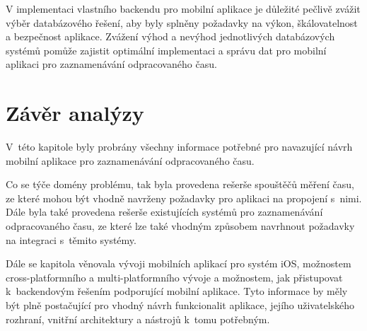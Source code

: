 V implementaci vlastního backendu pro mobilní aplikace je důležité pečlivě zvážit výběr databázového řešení, aby byly splněny požadavky na výkon, škálovatelnost a bezpečnost aplikace. Zvážení výhod a nevýhod jednotlivých databázových systémů pomůže zajistit optimální implementaci a správu dat pro mobilní aplikaci pro zaznamenávání odpracovaného času.

\section{Závěr analýzy}

V~této kapitole byly probrány všechny informace potřebné pro navazující návrh mobilní aplikace pro zaznamenávání odpracovaného času. 

Co se týče domény problému, tak byla provedena rešerše spouštěčů měření času, ze které mohou být vhodně navrženy požadavky pro aplikaci na propojení s~nimi. Dále byla také provedena rešerše existujících systémů pro zaznamenávání odpracovaného času, ze které lze také vhodným způsobem navrhnout požadavky na integraci s~těmito systémy.

Dále se kapitola věnovala vývoji mobilních aplikací pro systém iOS, možnostem cross-platformního a multi-platformního vývoje a možnostem, jak přistupovat k~backendovým řešením podporující mobilní aplikace. Tyto informace by měly být plně postačující pro vhodný návrh funkcionalit aplikace, jejího uživatelského rozhraní, vnitřní architektury a nástrojů k~tomu potřebným.











































